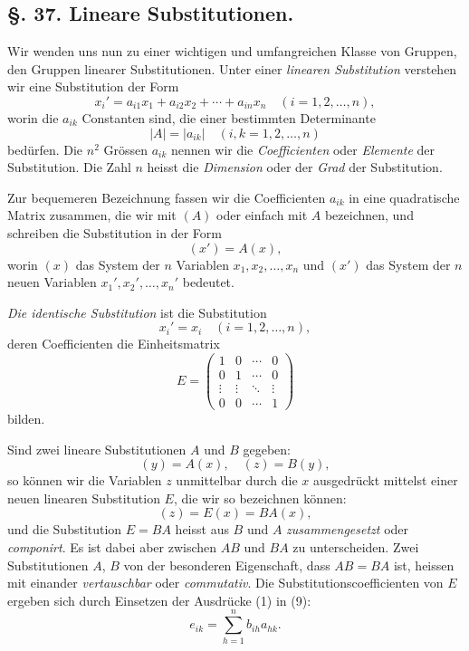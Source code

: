 \documentclass[12pt,a4paper]{article}
\theoremstyle{plain}
\theoremstyle{definition}
\theoremstyle{remark}
\begin{document}
\subsection*{\S. 37. Lineare Substitutionen.}

Wir wenden uns nun zu einer wichtigen und umfangreichen Klasse von Gruppen, den Gruppen linearer Substitutionen. Unter einer \emph{linearen Substitution} verstehen wir eine Substitution der Form
\begin{equation}
x_{i}' = a_{i1}x_{1} + a_{i2}x_{2} + \cdots + a_{in}x_{n}\quad (i = 1, 2, \ldots, n),
\end{equation}
worin die $a_{ik}$ Constanten sind, die einer bestimmten Determinante
\[
|A| = |a_{ik}|\quad (i,k = 1, 2, \ldots, n)
\]
bedürfen. Die $n^{2}$ Grössen $a_{ik}$ nennen wir die \emph{Coefficienten} oder \emph{Elemente} der Substitution. Die Zahl $n$ heisst die \emph{Dimension} oder der \emph{Grad} der Substitution.

Zur bequemeren Bezeichnung fassen wir die Coefficienten $a_{ik}$ in eine quadratische Matrix zusammen, die wir mit $(A)$ oder einfach mit $A$ bezeichnen, und schreiben die Substitution in der Form
\begin{equation}
(x') = A(x),
\end{equation}
worin $(x)$ das System der $n$ Variablen $x_{1}, x_{2}, \ldots, x_{n}$ und $(x')$ das System der $n$ neuen Variablen $x_{1}', x_{2}', \ldots, x_{n}'$ bedeutet.

\emph{Die identische Substitution} ist die Substitution
\[
x_{i}' = x_{i}\quad (i = 1, 2, \ldots, n),
\]
deren Coefficienten die Einheitsmatrix
\[
E = \begin{pmatrix}
1 & 0 & \cdots & 0\\
0 & 1 & \cdots & 0\\
\vdots & \vdots & \ddots & \vdots\\
0 & 0 & \cdots & 1
\end{pmatrix}
\]
bilden.

Sind zwei lineare Substitutionen $A$ und $B$ gegeben:
\begin{equation}
(y) = A(x),\quad (z) = B(y),
\end{equation}
so können wir die Variablen $z$ unmittelbar durch die $x$ ausgedrückt mittelst einer neuen linearen Substitution $E$, die wir so bezeichnen können:
\begin{equation}
(z) = E(x) = BA(x),
\end{equation}
und die Substitution $E = BA$ heisst aus $B$ und $A$ \emph{zusammengesetzt} oder \emph{componirt}. Es ist dabei aber zwischen $AB$ und $BA$ zu unterscheiden. Zwei Substitutionen $A$, $B$ von der besonderen Eigenschaft, dass $AB = BA$ ist, heissen mit einander \emph{vertauschbar} oder \emph{commutativ}. Die Substitutionscoefficienten von $E$ ergeben sich durch Einsetzen der Ausdrücke (1) in (9):
\begin{equation}
e_{ik} = \sum_{h=1}^{n} b_{ih}a_{hk}.
\end{equation}
\end{document}
